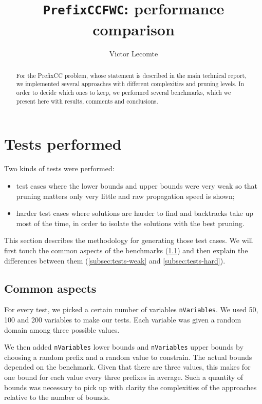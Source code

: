 \documentclass[a4paper,10pt]{article}
\begin{document}
\title{\texttt{PrefixCCFWC}: performance comparison}
\author{Victor Lecomte}
\maketitle

\begin{abstract}
For the PrefixCC problem, whose statement is described in the main technical report, we implemented several approaches with different complexities and pruning levels. In order to decide which ones to keep, we performed several benchmarks, which we present here with results, comments and conclusions.
\end{abstract}

\tableofcontents

\section{Tests performed}

Two kinds of tests were performed:
\begin{itemize}
    \item test cases where the lower bounds and upper bounds were very weak so that pruning matters only very little and raw propagation speed is shown;
    \item harder test cases where solutions are harder to find and backtracks take up most of the time, in order to isolate the solutions with the best pruning.
\end{itemize}

This section describes the methodology for generating those test cases. We will first touch the common aspects of the benchmarks (\ref{subsec:tests-common}) and then explain the differences between them (\ref{subsec:tests-weak} and \ref{subsec:tests-hard}).

\subsection{Common aspects}
\label{subsec:tests-common}
For every test, we picked a certain number of variables \texttt{nVariables}. We used 50, 100 and 200 variables to make our tests. Each variable was given a random domain among three possible values.

We then added \texttt{nVariables} lower bounds and \texttt{nVariables} upper bounds by choosing a random prefix and a random value to constrain. The actual bounds depended on the benchmark. Given that there are three values, this makes for one bound for each value every three prefixes in average. Such a quantity of bounds was necessary to pick up with clarity the complexities of the approaches relative to the number of bounds.
\end{document}

